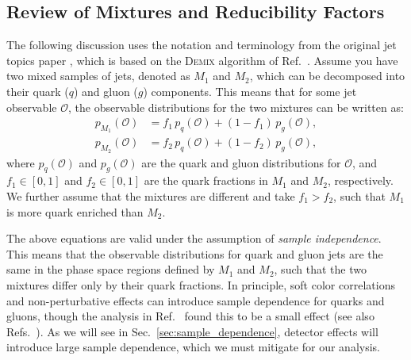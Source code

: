 \documentclass[aps,prd,twocolumn,preprintnumbers,nofootinbib,longbibliography,floatfix]{revtex4-1}
\DeclareRobustCommand{\Sec}[1]{Sec.~\ref{#1}}
\DeclareRobustCommand{\Ref}[1]{Ref.~\cite{#1}}
\DeclareRobustCommand{\Refs}[1]{Refs.~\cite{#1}}
\newcommand{\figO}{\mathcal{O}}
\newcommand{\cor}[1]{#1}
\begin{document}
\subsection{Review of Mixtures and Reducibility Factors}
\label{subsection:reduce_coef}

The following discussion uses the notation and terminology from the original jet topics paper \cite{Metodiev:2018ftz}, which is based on the \textsc{Demix} algorithm of \Ref{katz-samuels_decontamination_2019}.
%
Assume you have two mixed samples of jets, denoted as $M_1$ and $M_2$, which can be decomposed into their quark ($q$) and gluon ($g$) components.
%
This means that for some jet observable $\figO$, the observable distributions for the two mixtures can be written as:
%
\begin{align}
\label{eq:mixture_M1}
p_{M_1} (\figO) &= f_1 \, p_{q} (\figO) + (1 - f_1) \, p_{g} (\figO), \\
\label{eq:mixture_M2}
p_{M_2} (\figO) &= f_2 \, p_{q} (\figO) + (1 - f_2) \, p_{g} (\figO),
\end{align}
%
where $p_{q} (\figO)$ and $p_{g} (\figO)$ are the quark and gluon distributions for $\figO$, and $f_1 \in [0,1]$ and $f_2 \in [0,1]$ are the quark fractions in $M_1$ and $M_2$, respectively.
%
We further assume that the mixtures are different and take $f_1 > f_2$, such that $M_1$ is more quark enriched than $M_2$.


The above equations are valid under the assumption of \emph{sample independence}.
%
This means that the observable distributions for quark and gluon jets are the same in the phase space regions defined by $M_1$ and $M_2$, such that the two mixtures differ only by their quark fractions.
%
In principle, soft color correlations and non-perturbative effects can introduce sample dependence for quarks and gluons, though the analysis in \Ref{Komiske:2018vkc} found this to be a small effect (see also \cor{\Refs{ATLAS:2014vax,Bright-Thonney:2018mxq}}).
%
As we will see in \Sec{sec:sample_dependence}, detector effects will introduce large sample dependence, which we must mitigate for our analysis.
\end{document}
